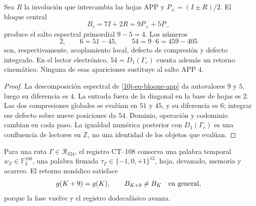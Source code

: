 \begin{proposition}
\label{10j-prop-cuatro-cincuentaycuatro}
Sea \(R\) la involución que intercambia las hojas APP y
\(P_\pm=(I\pm R)/2\). El bloque central
\begin{equation}
 B_c=7I+2R=9P_++5P_-
 \label{10j-eq-bloque-app}
\end{equation}
produce el salto espectral primordial \(9-5=4\). Los números
\begin{equation}
 2,\qquad 6=51-45,\qquad
 54=9\cdot6=459-405
 \label{10j-eq-despliegue-2-6-54}
\end{equation}
son, respectivamente, acoplamiento local, defecto de compresión y defecto
integrado. En el lector electrónico, \(54=D_1(\Gamma_e)\) cuenta además un
retorno cinemático. Ninguna de esas apariciones sustituye al salto APP \(4\).
\end{proposition}

\begin{proof}
La descomposición espectral de \eqref{10j-eq-bloque-app} da autovalores
\(9\) y \(5\), luego su diferencia es \(4\). La entrada fuera de la
diagonal en la base de hojas es \(2\). Las dos compresiones globales se
evalúan en \(51\) y \(45\), y su diferencia es \(6\); integrar ese defecto
sobre nueve posiciones da \(54\). Dominio, operación y codominio cambian en
cada paso. La igualdad numérica posterior con \(D_1(\Gamma_e)\) es una
confluencia de lectores en \(\mathbb Z\), no una identidad de los objetos
que evalúan.
\end{proof}

Para una ruta \(\Gamma\in\mathcal R_{324}\), el registro CT--108 conserva
una palabra temporal \(w_\Gamma\in\mathbb F_3^{108}\), una palabra firmada
\(\tau_\Gamma\in\{-1,0,+1\}^{12}\), hoja, devanado, memoria y acarreo. El
retorno nonádico satisface
\begin{equation}
 g(K+9)=g(K),\qquad B_{K+9}\ne B_K\quad\hbox{en general},
 \label{10j-eq-retorno-memoria}
\end{equation}
porque la fase vuelve y el registro dodecafásico avanza.

